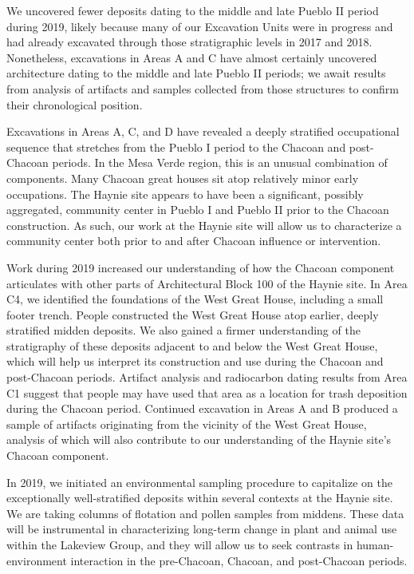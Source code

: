 \documentclass[
  12pt,
]{krantz}
\begin{document}
We uncovered fewer deposits dating to the middle and late Pueblo II
period during 2019, likely because many of our Excavation Units were in
progress and had already excavated through those stratigraphic levels in
2017 and 2018. Nonetheless, excavations in Areas A and C have almost
certainly uncovered architecture dating to the middle and late Pueblo II
periods; we await results from analysis of artifacts and samples
collected from those structures to confirm their chronological position.

Excavations in Areas A, C, and D have revealed a deeply stratified
occupational sequence that stretches from the Pueblo I period to the
Chacoan and post-Chacoan periods. In the Mesa Verde region, this is an
unusual combination of components. Many Chacoan great houses sit atop
relatively minor early occupations. The Haynie site appears to have been
a significant, possibly aggregated, community center in Pueblo I and
Pueblo II prior to the Chacoan construction. As such, our work at the
Haynie site will allow us to characterize a community center both prior
to and after Chacoan influence or intervention.

Work during 2019 increased our understanding of how the Chacoan
component articulates with other parts of Architectural Block 100 of the
Haynie site. In Area C4, we identified the foundations of the West Great
House, including a small footer trench. People constructed the West
Great House atop earlier, deeply stratified midden deposits. We also
gained a firmer understanding of the stratigraphy of these deposits
adjacent to and below the West Great House, which will help us interpret
its construction and use during the Chacoan and post-Chacoan periods.
Artifact analysis and radiocarbon dating results from Area C1 suggest
that people may have used that area as a location for trash deposition
during the Chacoan period. Continued excavation in Areas A and B
produced a sample of artifacts originating from the vicinity of the West
Great House, analysis of which will also contribute to our understanding
of the Haynie site's Chacoan component.

In 2019, we initiated an environmental sampling procedure to capitalize
on the exceptionally well-stratified deposits within several contexts at
the Haynie site. We are taking columns of flotation and pollen samples
from middens. These data will be instrumental in characterizing
long-term change in plant and animal use within the Lakeview Group, and
they will allow us to seek contrasts in human-environment interaction in
the pre-Chacoan, Chacoan, and post-Chacoan periods.
\end{document}

